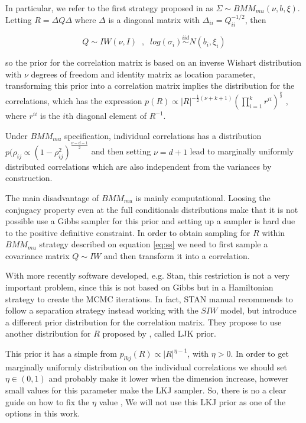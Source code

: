 \documentclass[a4paper]{article}
\begin{document}
In particular, we refer to the first strategy proposed in \cite{barnard2000} as $\Sigma \sim BMM_{mu}(\nu,b,\xi)$.  Letting $R = \Delta Q \Delta$ where $\Delta$ is a diagonal matrix with $\Delta_{ii} = Q_{ii}^{-1/2}$, then 

\begin{equation}
Q \sim IW(\nu, I ) \;\;, \;\;  log(\sigma_i) \stackrel{iid} \sim N(b_i, \xi_i)
\label{eq:ss}
\end{equation} 

so the prior for the correlation matrix is based on an inverse Wishart distribution with $\nu$ degrees of freedom and identity matrix as location parameter, transforming this prior into a correlation matrix implies the distribution for the correlations, which has the expression  $p(R) \propto |R|^{-\frac{1}{2}(\nu+k+1) }  (\prod_{i=1}^k r^{ii}) ^{\frac{\nu}{2}}$ , where $r^{ii}$ is the $i$th diagonal element of $R^{-1}$. 

Under $BMM_{mu}$ specification, individual correlations has a distribution $p(\rho_{ij} \propto (1-\rho_{ij}^2)^{\frac{\nu-d-1}{2}}$ and then setting $\nu=d+1$ lead to marginally uniformly distributed correlations which are also independent from the variances by construction. 

The main disadvantage of $BMM_{mu}$ is mainly computational. Loosing the conjugacy property even at the full conditionals distributions make that it is not possible use a Gibbs sampler for this prior and setting up a sampler is hard due to the positive definitive constraint. In order to obtain sampling for $R$ within $BMM_{mu}$ strategy described on equation \ref{eq:ss} we need to first sample a covariance matrix $Q \sim IW$ and then transform it  into a correlation. 

With more recently software developed, e.g. Stan, \citep{stan2014} this restriction is not a very important problem, since this is not based on Gibbs but in a Hamiltonian strategy to create the MCMC iterations.  In fact, STAN manual \citep{stanmanual2014} recommends to follow a separation strategy instead working with the $SIW$ model, but introduce a different prior distribution for the correlation matrix. They propose to use another distribution for $R$ proposed by \cite{lewandowski2009generating}, called LJK prior.   

This prior it has a simple from $p_{lkj}(R) \propto |R|^{\eta-1}$, with $\eta > 0$. In order to get marginally uniformly distribution on the individual correlations we should  set $\eta \in (0,1)$ and probably make it lower when the dimension increase, however small values for this parameter make the LKJ sampler. So, there is no a clear guide on how to fix the $\eta$ value , We will not use this LKJ prior as one of the options in this work. 
\end{document}

